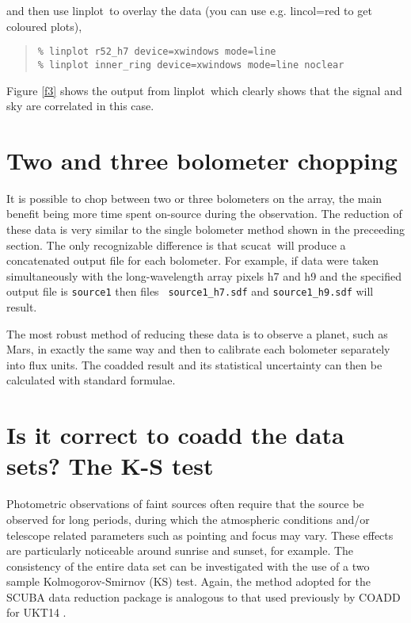 \documentclass[twoside,11pt,fleqn]{article}
\newenvironment{myquote}{\begin{quote}\begin{small}}{\end{small}\end{quote}}
\newcommand{\task}[1]{{\sf #1}}
\newcommand{\scucat}{\xref{\task{scucat}}{sun216}{SCUCAT}}
\newcommand{\linplot}{\xref{\task{linplot}}{sun95}{LINPLOT}}
\newcommand{\xref}[3]{#1}
\newcommand{\xlabel}[1]{}
\begin{document}
and then use \linplot\ to overlay the data (you can use
e.g. lincol=red to get coloured plots),

\begin{myquote}
\begin{verbatim}
% linplot r52_h7 device=xwindows mode=line
% linplot inner_ring device=xwindows mode=line noclear
\end{verbatim}
\end{myquote}

Figure \ref{f3} shows the output from \linplot\ which clearly shows that
the signal and sky are correlated in this case.

\section{\xlabel{twobol}Two and three bolometer chopping\label{twobol}}

It is possible to chop between two or three bolometers on the array,
the main benefit being more time spent on-source during the
observation. The reduction of these data is very similar to the single
bolometer method shown in the preceeding section. The only
recognizable difference is that \scucat\ will produce a
concatenated output file for each bolometer. For example, if data were
taken simultaneously with the long-wavelength array pixels h7 and h9
and the specified output file is {\tt source1} then files {\tt
source1\_h7.sdf} and {\tt source1\_h9.sdf} will result.

The most robust method of reducing these data is to observe a planet,
such as Mars, in exactly the same way and then to calibrate each
bolometer separately into flux units. The coadded result and its
statistical uncertainty can then be calculated with standard formulae.  

\section{Is it correct to coadd the data sets? The K-S test}

Photometric observations of faint sources often require that the
source be observed for long periods, during which the atmospheric
conditions and/or telescope related parameters such as pointing and
focus may vary. These effects are particularly noticeable around
sunrise and sunset, for example. The consistency of the entire data
set can be investigated with the use of a two sample
Kolmogorov-Smirnov (KS) test. Again, the method adopted for the SCUBA
data reduction package is analogous to that used previously by COADD
for UKT14 \cite{dhh}. 
\end{document}
